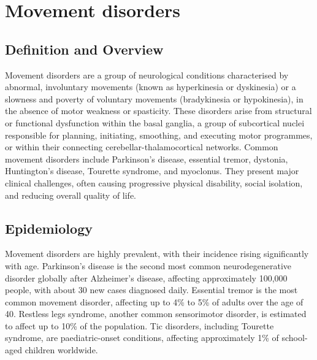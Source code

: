 \chapter{Movement disorders}

\section*{Definition and Overview}
Movement disorders are a group of neurological conditions characterised by abnormal, involuntary movements (known as hyperkinesia or dyskinesia) or a slowness and poverty of voluntary movements (bradykinesia or hypokinesia), in the absence of motor weakness or spasticity. These disorders arise from structural or functional dysfunction within the basal ganglia, a group of subcortical nuclei responsible for planning, initiating, smoothing, and executing motor programmes, or within their connecting cerebellar-thalamocortical networks. Common movement disorders include Parkinson's disease, essential tremor, dystonia, Huntington's disease, Tourette syndrome, and myoclonus. They present major clinical challenges, often causing progressive physical disability, social isolation, and reducing overall quality of life.

\section*{Epidemiology}
Movement disorders are highly prevalent, with their incidence rising significantly with age. Parkinson's disease is the second most common neurodegenerative disorder globally after Alzheimer's disease, affecting approximately 100,000 people, with about 30 new cases diagnosed daily. Essential tremor is the most common movement disorder, affecting up to 4\% to 5\% of adults over the age of 40. Restless legs syndrome, another common sensorimotor disorder, is estimated to affect up to 10\% of the population. Tic disorders, including Tourette syndrome, are paediatric-onset conditions, affecting approximately 1\% of school-aged children worldwide.

